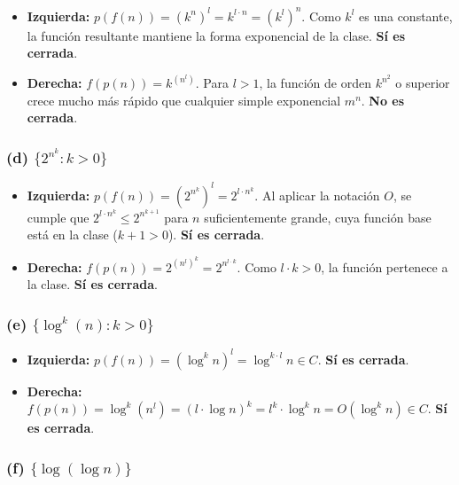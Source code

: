 \documentclass[12pt]{book} %
\providecommand{\tightlist}{%
  \setlength{\itemsep}{0pt}\setlength{\parskip}{0pt}}
\begin{document}
\begin{itemize}
\tightlist
\item
  \textbf{Izquierda:} \(p(f(n)) = (k^n)^l = k^{l \cdot n} = (k^l)^n\).
  Como \(k^l\) es una constante, la función resultante mantiene la forma
  exponencial de la clase. \textbf{Sí es cerrada}.
\item
  \textbf{Derecha:} \(f(p(n)) = k^{(n^l)}\). Para \(l > 1\), la función
  de orden \(k^{n^2}\) o superior crece mucho más rápido que cualquier
  simple exponencial \(m^n\). \textbf{No es cerrada}.
\end{itemize}

\hypertarget{d-2nk-k-0}{%
\subsubsection{\texorpdfstring{(d)
\(\{2^{n^k} : k > 0\}\)}{(d) \textbackslash\{2\^{}\{n\^{}k\} : k \textgreater{} 0\textbackslash\}}}\label{d-2nk-k-0}}

\begin{itemize}
\tightlist
\item
  \textbf{Izquierda:} \(p(f(n)) = (2^{n^k})^l = 2^{l \cdot n^k}\). Al
  aplicar la notación \(O\), se cumple que
  \(2^{l \cdot n^k} \le 2^{n^{k+1}}\) para \(n\) suficientemente grande,
  cuya función base está en la clase (\(k+1 > 0\)). \textbf{Sí es
  cerrada}.
\item
  \textbf{Derecha:} \(f(p(n)) = 2^{(n^l)^k} = 2^{n^{l \cdot k}}\). Como
  \(l \cdot k > 0\), la función pertenece a la clase. \textbf{Sí es
  cerrada}.
\end{itemize}

\hypertarget{e-logkn-k-0}{%
\subsubsection{\texorpdfstring{(e)
\(\{\log^k(n) : k > 0\}\)}{(e) \textbackslash\{\textbackslash log\^{}k(n) : k \textgreater{} 0\textbackslash\}}}\label{e-logkn-k-0}}

\begin{itemize}
\tightlist
\item
  \textbf{Izquierda:}
  \(p(f(n)) = (\log^k n)^l = \log^{k \cdot l} n \in C\). \textbf{Sí es
  cerrada}.
\item
  \textbf{Derecha:}
  \(f(p(n)) = \log^k(n^l) = (l \cdot \log n)^k = l^k \cdot \log^k n = O(\log^k n) \in C\).
  \textbf{Sí es cerrada}.
\end{itemize}

\hypertarget{f-loglog-n}{%
\subsubsection{\texorpdfstring{(f)
\(\{\log(\log n)\}\)}{(f) \textbackslash\{\textbackslash log(\textbackslash log n)\textbackslash\}}}\label{f-loglog-n}}
\end{document}
